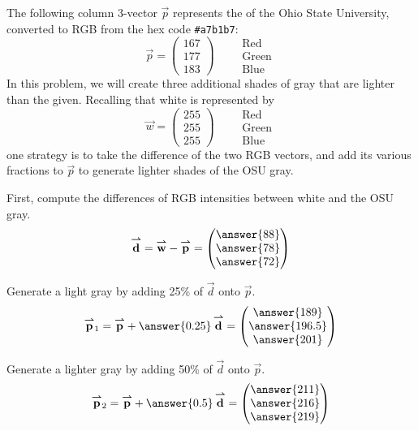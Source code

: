 \documentclass{ximera}
\author{Tae Eun Kim}
\begin{document}
\begin{exercise}
  The following column 3-vector $\vec{p}$ represents the  of the Ohio State
  University, converted to RGB from the hex code \verb|#a7b1b7|:
  \[
    \vec{p} = \begin{pmatrix}
      167\\ 177\\ 183
    \end{pmatrix}
    \qquad
    \begin{array}{l}
      \text{Red}\\
      \text{Green}\\
      \text{Blue}
    \end{array}
  \]
  In this problem, we will create three additional shades of gray that are
  lighter than the given. Recalling that white is represented by
  \[
    \vec{w} = \begin{pmatrix}
      255\\ 255\\ 255
    \end{pmatrix}
    \qquad
    \begin{array}{l}
      \text{Red}\\
      \text{Green}\\
      \text{Blue}
    \end{array}
  \]
  one strategy is to take the difference of the two RGB vectors, and
  add its various fractions to $\vec{p}$ to generate lighter shades of
  the OSU gray.

  First, compute the differences of RGB intensities between white and the OSU
  gray.
  \[
    \vec{d} = \vec{w} - \vec{p} =
    \begin{pmatrix}
      \answer{88}\\
      \answer{78}\\
      \answer{72}
    \end{pmatrix}
  \]

  Generate a light gray by adding 25\% of $\vec{d}$ onto $\vec{p}$.
  \[
    \vec{p}_1 = \vec{p} + \answer{0.25}\,\vec{d} =
    \begin{pmatrix}
      \answer{189}\\
      \answer{196.5}\\
      \answer{201}
    \end{pmatrix}
  \]

  Generate a lighter gray by adding 50\% of $\vec{d}$ onto $\vec{p}$.
  \[
    \vec{p}_2 = \vec{p} + \answer{0.5}\,\vec{d} =
    \begin{pmatrix}
      \answer{211}\\
      \answer{216}\\
      \answer{219}
    \end{pmatrix}
  \]


\end{exercise}
\end{document}
